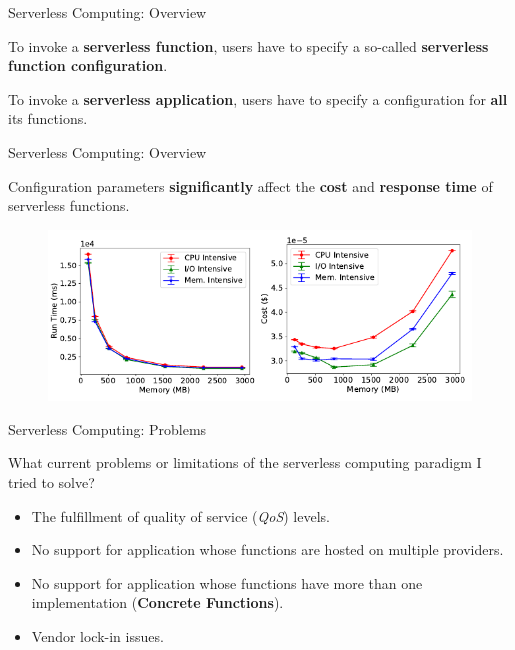 \documentclass[13.5pt]{beamer}
\newcommand{\B}[1]{\textcolor{TorVergataColor}{\textbf{#1}}}
\begin{document}
\begin{frame}{Serverless Computing: Overview}
	
	\begin{block}{}
		\centering
		To invoke a \B{serverless function}, users have to specify a so-called \B{serverless function configuration}.
	\end{block}
	\vspace{\baselineskip}
	\begin{block}{}
		\centering
		To invoke a \B{serverless application}, users have to specify a configuration for \B{all} its functions.
	\end{block}
	
	
\end{frame} 
\begin{frame}{Serverless Computing: Overview}
	
	Configuration parameters \B{significantly} affect the \B{cost} and \B{response time} of serverless functions.
	\vspace{\baselineskip}
	\begin{figure}[h]
		\centering
		\includegraphics[width=\textwidth]{../Images/slideImage1.png}
	\end{figure}
	
\end{frame} 
\begin{frame}{Serverless Computing: Problems}
	
	\begin{block}{}
		\centering
		What current problems or limitations of the serverless computing paradigm I tried to solve?
	\end{block}
\vspace{\baselineskip}
	\begin{itemize}
		\item The fulfillment of quality of service (\textit{QoS}) levels.
		\item No support for application whose functions are hosted on multiple providers.
		\item No support for application whose functions have more than one implementation (\B{Concrete Functions}).
		\item Vendor lock-in issues.
	\end{itemize}

\end{frame} 
\end{document}
